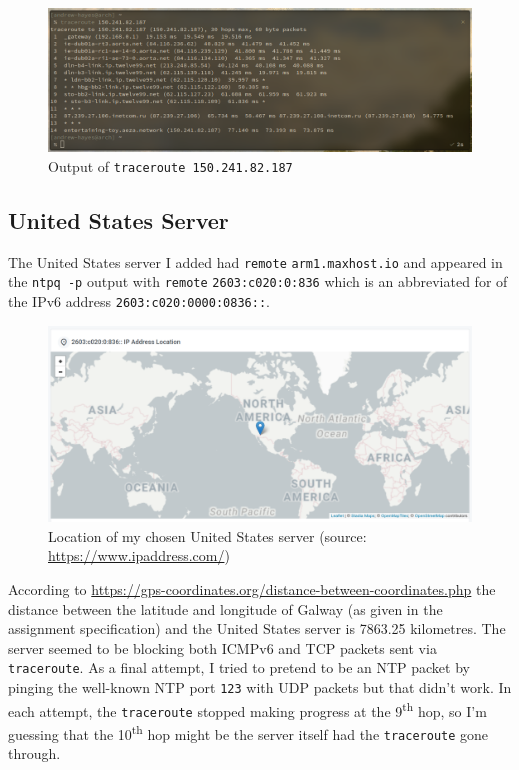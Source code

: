 \documentclass[a4paper]{article}
\begin{document}
\begin{figure}[H]
    \centering
    \includegraphics[width=\textwidth]{./images/europetraceroute.png}
    \caption{Output of \texttt{traceroute 150.241.82.187}}
\end{figure}

\subsection{United States Server}
The United States server I added had \verb|remote| \verb|arm1.maxhost.io| and appeared in the \texttt{ntpq -p} output with \verb|remote| \verb|2603:c020:0:836| which is an abbreviated for of the IPv6 address \verb|2603:c020:0000:0836::|.

\begin{figure}[H]
    \centering
    \includegraphics[width=\textwidth]{./images/usserverloc.png}
    \caption{Location of my chosen United States server (source: \url{https://www.ipaddress.com/})}
\end{figure}

According to \url{https://gps-coordinates.org/distance-between-coordinates.php} the distance between the latitude and longitude of Galway (as given in the assignment specification) and the United States server is 7863.25 kilometres.
The server seemed to be blocking both ICMPv6 and TCP packets sent via \texttt{traceroute}.
As a final attempt, I tried to pretend to be an NTP packet by pinging the well-known NTP port \verb|123| with UDP packets but that didn't work.
In each attempt, the \texttt{traceroute} stopped making progress at the 9\textsuperscript{th} hop, so I'm guessing that the 10\textsuperscript{th} hop might be the server itself had the \texttt{traceroute} gone through.
\end{document}
